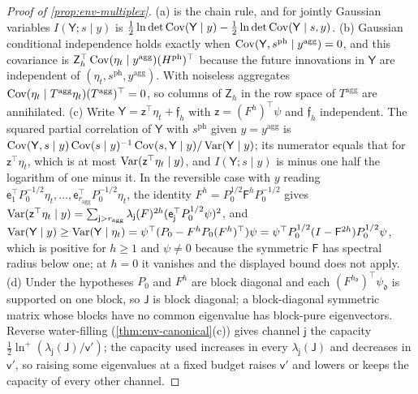 \begin{proof}[Proof of \cref{prop:env-multiplex}]
(a) is the chain rule, and for jointly Gaussian variables $I(\mathsf Y;s\mid y)$ is $\frac12\ln\det\operatorname{Cov}(\mathsf Y\mid y)-\frac12\ln\det\operatorname{Cov}(\mathsf Y\mid s,y)$. (b) Gaussian conditional independence holds exactly when $\operatorname{Cov}(\mathsf Y,s^{\mathrm{ph}}\mid y^{\mathrm{agg}})=0$, and this covariance is $\mathsf Z_h^\top\operatorname{Cov}(\eta_t\mid y^{\mathrm{agg}})(H^{\mathrm{ph}})^\top$ because the future innovations in $\mathsf Y$ are independent of $(\eta_t,s^{\mathrm{ph}},y^{\mathrm{agg}})$. With noiseless aggregates $\operatorname{Cov}(\eta_t\mid T^{\mathrm{agg}}\eta_t)(T^{\mathrm{agg}})^\top=0$, so columns of $\mathsf Z_h$ in the row space of $T^{\mathrm{agg}}$ are annihilated. (c) Write $\mathsf Y=\mathsf z^\top\eta_t+\mathfrak f_h$ with $\mathsf z=(F^h)^\top\psi$ and $\mathfrak f_h$ independent. The squared partial correlation of $\mathsf Y$ with $s^{\mathrm{ph}}$ given $y=y^{\mathrm{agg}}$ is $\operatorname{Cov}(\mathsf Y,s\mid y)\operatorname{Cov}(s\mid y)^{-1}\operatorname{Cov}(s,\mathsf Y\mid y)/\operatorname{Var}(\mathsf Y\mid y)$; its numerator equals that for $\mathsf z^\top\eta_t$, which is at most $\operatorname{Var}(\mathsf z^\top\eta_t\mid y)$, and $I(\mathsf Y;s\mid y)$ is minus one half the logarithm of one minus it. In the reversible case with $y$ reading $\mathsf e_1^\top P_0^{-1/2}\eta_t,\dots,\mathsf e_{r_{\mathrm{agg}}}^\top P_0^{-1/2}\eta_t$, the identity $F^h=P_0^{1/2}\mathsf F^hP_0^{-1/2}$ gives $\operatorname{Var}(\mathsf z^\top\eta_t\mid y)=\sum_{\mathsf j>r_{\mathrm{agg}}}\lambda_{\mathsf j}(F)^{2h}(\mathsf e_{\mathsf j}^\top P_0^{1/2}\psi)^2$, and $\operatorname{Var}(\mathsf Y\mid y)\ge\operatorname{Var}(\mathsf Y\mid\eta_t)=\psi^\top(P_0-F^hP_0(F^h)^\top)\psi=\psi^\top P_0^{1/2}(I-\mathsf F^{2h})P_0^{1/2}\psi$, which is positive for $h\ge1$ and $\psi\ne0$ because the symmetric $\mathsf F$ has spectral radius below one; at $h=0$ it vanishes and the displayed bound does not apply. (d) Under the hypotheses $P_0$ and $F^h$ are block diagonal and each $(F^{h_{\mathfrak d}})^\top\psi_{\mathfrak d}$ is supported on one block, so $\mathsf J$ is block diagonal; a block-diagonal symmetric matrix whose blocks have no common eigenvalue has block-pure eigenvectors. Reverse water-filling (\cref{thm:env-canonical}(c)) gives channel $\mathsf j$ the capacity $\frac12\ln^+(\lambda_{\mathsf j}(\mathsf J)/\mathsf v')$; the capacity used increases in every $\lambda_{\mathsf j}(\mathsf J)$ and decreases in $\mathsf v'$, so raising some eigenvalues at a fixed budget raises $\mathsf v'$ and lowers or keeps the capacity of every other channel.
\end{proof}
